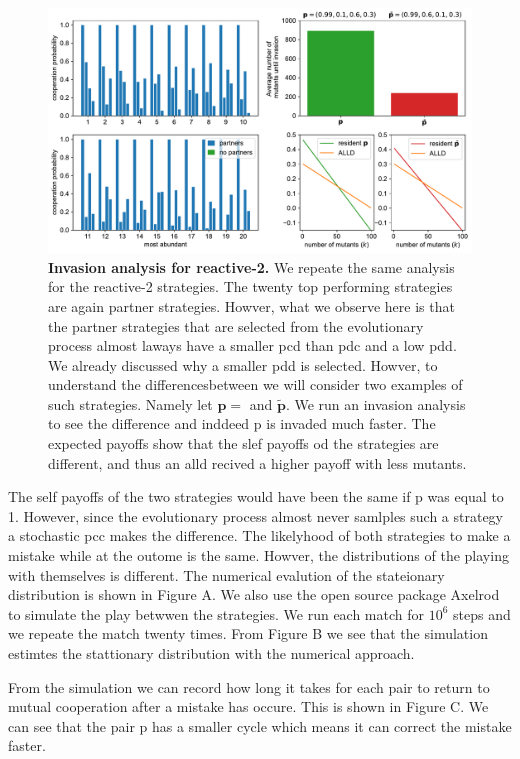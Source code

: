 \documentclass[11pt]{article}
\theoremstyle{plainCl1}
\theoremstyle{plainCl2}
\begin{document}
\begin{figure}[tbhp]
  \centering
  \includegraphics[width=\textwidth]{../../figures/siFigInvasionR2.pdf}
  \caption{\textbf{Invasion analysis for reactive-2.} We repeate the same
  analysis for the reactive-2 strategies. The twenty top performing strategies
  are again partner strategies. Howver, what we observe here is that the
  partner strategies that are selected from the evolutionary process
  almost laways have a smaller pcd than pdc and a low pdd. We already discussed
  why a smaller pdd is selected. Howver, to understand the differencesbetween
  we will consider two examples of such strategies. Namely let $\mathbf{p}=$
  and $\mathbf{\tilde{p}}$. We run an invasion analysis to see the difference
  and inddeed p is invaded much faster. The expected payoffs show that the
  slef payoffs od the strategies are different, and thus an alld recived
  a higher payoff with less mutants.
  }
\end{figure}

The self payoffs of the two strategies would have been the same if p was
equal to 1. However, since the evolutionary process almost never samlples such
a strategy a stochastic pcc makes the difference. The likelyhood of both strategies
to make a mistake while at the outome is the same. Howver, the distributions of
the playing with themselves is different. The numerical evalution of the stateionary
distribution is shown in Figure A. We also use the open source package Axelrod
to simulate the play betwwen the strategies. We run each match for $10^6$ steps
and we repeate the match twenty times. From Figure B we see that the simulation
estimtes the stattionary distribution with the numerical approach. 

From the simulation we can record how long it takes for each pair to return
to mutual cooperation after a mistake has occure. This is shown in Figure C.
We can see that the pair p has a smaller cycle which means it can correct the
mistake faster.
\end{document}
